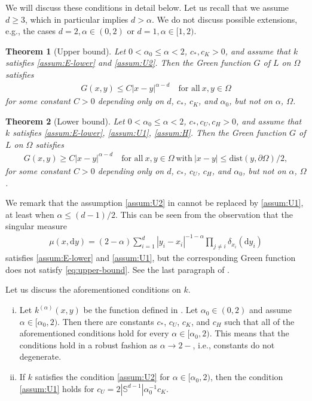 \documentclass[reqno]{amsart}
\theoremstyle{plain}
\newtheorem{theorem}{Theorem}[section]
\theoremstyle{definition}
\numberwithin{equation}{section}
\renewcommand{\d}{\mathrm{d}}
\newcommand{\cl} {c_{\ast}}
\newcommand{\cU} {c_U}
\newcommand{\cK} {c_K}
\newcommand{\cH} {c_H}
\begin{document}
We will discuss these conditions in detail below. Let us recall that we assume $d \geq 3$, which in particular implies $d > \alpha$. We do not discuss possible extensions, e.g., the cases $d=2, \alpha \in (0,2)$ or $d=1, \alpha \in [1, 2)$.

\begin{theorem} [Upper bound] \label{thm:upper-bound}
Let $0 < \alpha_0 \leq \alpha < 2$, $\cl, \cK > 0$, and assume that $k$ satisfies \eqref{assum:E-lower} and \eqref{assum:U2}. Then the Green function $G$ of $L$ on $\Omega$ satisfies
\begin{align} \label{eq:upper-bound}
G(x,y) \leq C |x-y|^{\alpha-d} \quad\text{for all} ~ x, y \in \Omega
\end{align}
for some constant $C > 0$ depending only on $d$, $\cl$, $\cK$, and $\alpha_0$, but not on $\alpha$, $\Omega$.
\end{theorem}

\begin{theorem} [Lower bound] \label{thm:lower-bound}
Let $0 < \alpha_0 \leq \alpha < 2$, $\cl, \cU, \cH > 0$, and assume that $k$ satisfies \eqref{assum:E-lower}, \eqref{assum:U1}, \eqref{assum:H}. Then the Green function $G$ of $L$ on $\Omega$ satisfies
\begin{align} \label{eq:lower-bound}
G(x,y) \geq C |x-y|^{\alpha-d} \quad\text{for all} ~ x, y \in \Omega 
~\text{with}~ |x-y| \leq \mathrm{dist}(y, \partial \Omega)/2,
\end{align}
for some constant $C > 0$ depending only on $d$, $\cl$, $\cU$, $\cH$, and $\alpha_0$, but not on $\alpha$, $\Omega$.
\end{theorem}

We remark that the assumption \eqref{assum:U2} in  cannot be replaced by \eqref{assum:U1}, at least when $\alpha \leq (d-1)/2$. This can be seen from the observation that the singular measure
\begin{align*}
\mu(x, \d y) = (2-\alpha) \sum_{i=1}^d |y_i-x_i|^{-1-\alpha} \prod_{j \neq i} \delta_{x_i}(\d y_i)
\end{align*}
satisfies \eqref{assum:E-lower} and \eqref{assum:U1}, but the corresponding Green function does not satisfy \eqref{eq:upper-bound}. See the last paragraph of \cite{BoSz05}.

Let us discuss the aforementioned conditions on $k$. 
\begin{enumerate}[(i)]
\item
Let $k^{(\alpha)}(x, y)$ be the function defined in . Let $\alpha_0 \in (0,2)$ and assume $\alpha \in [\alpha_0, 2)$. Then there are constants $\cl$, $\cU$, $\cK$, and $\cH$ such that all of the aforementioned conditions hold for every $\alpha \in [\alpha_0, 2)$. This means that the conditions hold in a robust fashion as $\alpha \to 2-$, i.e., constants do not degenerate.

\item
If $k$ satisfies the condition \eqref{assum:U2} for $\alpha \in [\alpha_0, 2)$, then the condition \eqref{assum:U1} holds for $\cU = 2|\mathbb{S}^{d-1}| \alpha_0^{-1}\cK$. 
\end{enumerate}
\end{document}

